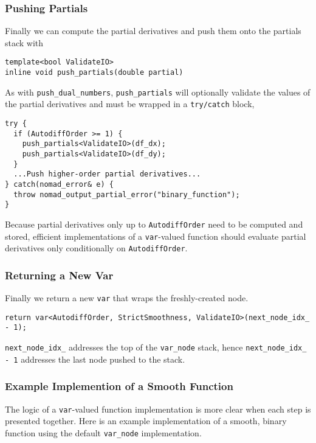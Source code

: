 \subsubsection{Pushing Partials}

Finally we can compute the partial derivatives and push them onto the
partials stack with
%
\begin{verbatim}
template<bool ValidateIO>
inline void push_partials(double partial)
\end{verbatim}
%
As with \verb|push_dual_numbers|, \verb|push_partials| will optionally
validate the values of the partial derivatives and must be wrapped in
a \verb|try/catch| block,
%
\begin{verbatim}
try {
  if (AutodiffOrder >= 1) {
    push_partials<ValidateIO>(df_dx);
    push_partials<ValidateIO>(df_dy);
  }
  ...Push higher-order partial derivatives...
} catch(nomad_error& e) {
  throw nomad_output_partial_error("binary_function");
}
\end{verbatim}

Because partial derivatives only up to \verb|AutodiffOrder| need to be
computed and stored, efficient implementations of a \verb|var|-valued
function should evaluate partial derivatives only conditionally on
\verb|AutodiffOrder|.

\subsubsection{Returning a New Var}

Finally we return a new \verb|var| that wraps the freshly-created node.
%
\begin{verbatim}
return var<AutodiffOrder, StrictSmoothness, ValidateIO>(next_node_idx_ - 1);
\end{verbatim}
%
\verb|next_node_idx_| addresses the top of the \verb|var_node| stack, hence
\verb|next_node_idx_ - 1| addresses the last node pushed to the stack.

\subsubsection{Example Implemention of a Smooth Function}

The logic of a \verb|var|-valued function implementation is more clear
when each step is presented together.  Here is an example implementation
of a smooth, binary function using the default \verb|var_node| implementation.

